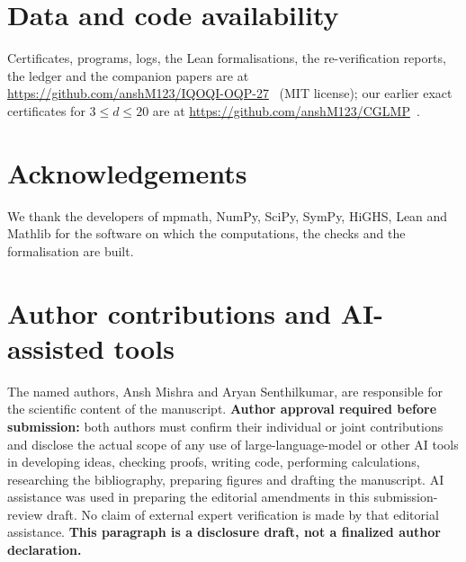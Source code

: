 \documentclass[11pt]{article}
\theoremstyle{remark}
\numberwithin{equation}{section}
\begin{document}
\section*{Data and code availability}
Certificates, programs, logs, the Lean formalisations, the re-verification reports, the ledger and the companion
papers are at \url{https://github.com/anshM123/IQOQI-OQP-27}~\cite{repo} (MIT license); our
earlier exact certificates for $3\le d\le20$ are at \url{https://github.com/anshM123/CGLMP}~\cite{repoCGLMP}.

\section*{Acknowledgements}
We thank the developers of mpmath, NumPy, SciPy, SymPy, HiGHS, Lean and Mathlib for the software on which the
computations, the checks and the formalisation are built.

\section*{Author contributions and AI-assisted tools}
The named authors, Ansh Mishra and Aryan Senthilkumar, are responsible for the scientific
content of the manuscript. \textbf{Author approval required before submission:} both authors must
confirm their individual or joint contributions and disclose the actual scope of any use of
large-language-model or other AI tools in developing ideas, checking proofs, writing code,
performing calculations, researching the bibliography, preparing figures and drafting the manuscript.
AI assistance was used in preparing the editorial amendments in this submission-review draft.
No claim of external expert verification is made by that editorial assistance.
\textbf{This paragraph is a disclosure draft, not a finalized author declaration.}
\end{document}
